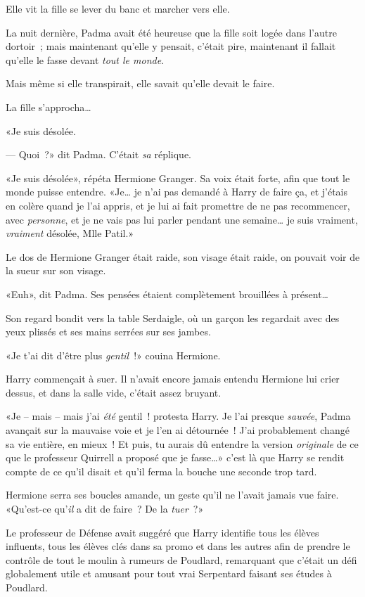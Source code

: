 Elle vit la fille se lever du banc et marcher vers elle.

La nuit dernière, Padma avait été heureuse que la fille soit logée dans l'autre dortoir~; mais maintenant qu'elle y pensait, c'était pire, maintenant il fallait qu'elle le fasse devant \emph{tout le monde}.

Mais même si elle transpirait, elle savait qu'elle devait le faire.

La fille s'approcha…

«Je suis désolée.

--- Quoi~?» dit Padma. C'était \emph{sa} réplique.

«Je suis désolée», répéta Hermione Granger. Sa voix était forte, afin que tout le monde puisse entendre. «Je… je n'ai pas demandé à Harry de faire ça, et j'étais en colère quand je l'ai appris, et je lui ai fait promettre de ne pas recommencer, avec \emph{personne}, et je ne vais pas lui parler pendant une semaine… je suis vraiment, \emph{vraiment} désolée, Mlle Patil.»

Le dos de Hermione Granger était raide, son visage était raide, on pouvait voir de la sueur sur son visage.

«Euh», dit Padma. Ses pensées étaient complètement brouillées à présent…

Son regard bondit vers la table Serdaigle, où un garçon les regardait avec des yeux plissés et ses mains serrées sur ses jambes.


«Je t'ai dit d'être plus \emph{gentil}~!» couina Hermione.

Harry commençait à suer. Il n'avait encore jamais entendu Hermione lui crier dessus, et dans la salle vide, c'était assez bruyant.

«Je -- mais -- mais j'ai \emph{été} gentil~! protesta Harry. Je l'ai presque \emph{sauvée}, Padma avançait sur la mauvaise voie et je l'en ai détournée~! J'ai probablement changé sa vie entière, en mieux~! Et puis, tu aurais dû entendre la version \emph{originale} de ce que le professeur Quirrell a proposé que je fasse…» c'est là que Harry se rendit compte de ce qu'il disait et qu'il ferma la bouche une seconde trop tard.

Hermione serra ses boucles amande, un geste qu'il ne l'avait jamais vue faire. «Qu'est-ce qu'\emph{il} a dit de faire~? De la \emph{tuer}~?»

Le professeur de Défense avait suggéré que Harry identifie tous les élèves influents, tous les élèves clés dans sa promo et dans les autres afin de prendre le contrôle de tout le moulin à rumeurs de Poudlard, remarquant que c'était un défi globalement utile et amusant pour tout vrai Serpentard faisant ses études à Poudlard.


